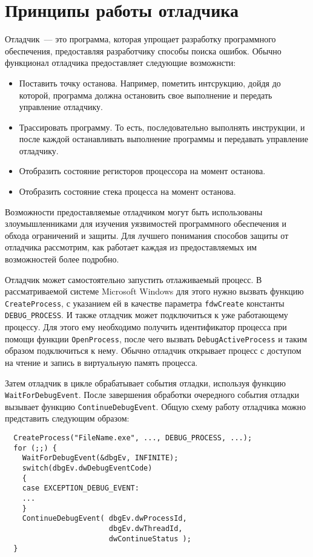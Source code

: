 \section{Принципы работы отладчика}
Отладчик~--- это программа, которая упрощает разработку программного
обеспечения, предоставляя разработчику способы поиска ошибок. Обычно функционал
отладчика предоставляет следующие возможнсти:
\begin{itemize}
  \item Поставить точку останова. Например, пометить интсрукцию, дойдя до
    которой, программа должна остановить свое выполнение и передать управление
    отладчику.
  \item Трассировать программу. То есть, последовательно выполнять инструкции, и
    после каждой останавливать выполнение программы и передавать управление
    отладчику.
  \item Отобразить состояние регисторов процессора на момент останова.
  \item Отобразить состояние стека процесса на момент останова.
\end{itemize}

Возможности предоставляемые отладчиком могут быть использованы злоумышленниками
для изучения уязвимостей программного обеспечения и обхода ограничений и защиты.
Для лучшего понимания способов защиты от отладчика рассмотрим, как работает
каждая из предоставляемых им возможностей более подробно.

Отладчик может самостоятельно запустить отлаживаемый процесс. В рассматриваемой
системе Microsoft Windows для этого нужно вызвать функцию \verb!CreateProcess!,
с указанием ей в качестве параметра \verb!fdwCreate! константы
\verb!DEBUG_PROCESS!. И также отладчик может подключиться к уже работающему
процессу. Для этого ему необходимо получить идентификатор процесса при помощи
функции \verb!OpenProcess!, после чего вызвать \verb!DebugActiveProcess! и таким
образом подключиться к нему.  Обычно отладчик открывает процесс с доступом на
чтение и запись в виртуальную память процесса.

Затем отладчик в цикле обрабатывает события отладки, используя функцию
\verb!WaitForDebugEvent!. После завершения обработки очередного события отладки
вызывает функцию \verb!ContinueDebugEvent!. Общую схему работу отладчика можно
представить следующим образом:
\begin{verbatim}
  CreateProcess("FileName.exe", ..., DEBUG_PROCESS, ...); 
  for (;;) {
    WaitForDebugEvent(&dbgEv, INFINITE);
    switch(dbgEv.dwDebugEventCode) 
    {
    case EXCEPTION_DEBUG_EVENT:
    ...
    }
    ContinueDebugEvent( dbgEv.dwProcessId,
                        dbgEv.dwThreadId,
                        dwContinueStatus );
  }
\end{verbatim}

